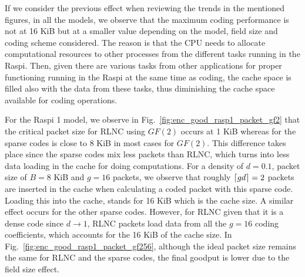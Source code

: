 If we consider the previous effect when reviewing the trends in the
mentioned figures, in all the models, we observe that the maximum coding performance is not
at 16 KiB but at a smaller value depending on the model, field size
and coding scheme considered. The reason is that the \ac{CPU} needs to
allocate computational resources to other processes from the different tasks
running in the \ac{Raspi}. Then, given there are various
tasks from other applications for proper functioning running in the
\ac{Raspi} at the same time as coding, the cache space is filled also
with the data from these tasks, thus diminishing the cache space available
for coding operations.

For the \ac{Raspi} 1 model, we observe in
Fig.~\ref{fig:enc_good_rasp1_packet_gf2} that the critical
packet size for \ac{RLNC} using $GF(2)$ occurs at 1 KiB whereas for the
sparse codes is close to 8 KiB in most cases for $GF(2)$. This
difference takes place since the sparse codes mix less packets
than \ac{RLNC}, which turns into less data loading in the
cache for doing computations. For a density of $d = 0.1$, packet size of
$B = 8$ KiB and $g = 16$ packets, we observe that roughly $\left\lceil gd\right\rceil = 2$
packets are inserted in the cache when calculating a coded packet with this
sparse code. Loading this into the cache, stands for 16 KiB which is the
cache size. A similar effect occurs for the other sparse codes. However, for
\ac{RLNC} given that it is a dense code since $d \to 1$, \ac{RLNC}
packets load data from all the $g = 16$ coding coefficients, which accounts
for the 16 KiB of the cache size. In
Fig.~\ref{fig:enc_good_rasp1_packet_gf256}, although the ideal packet
size remains the same for \ac{RLNC} and the sparse codes, the final goodput
is lower due to the field size effect.
%
